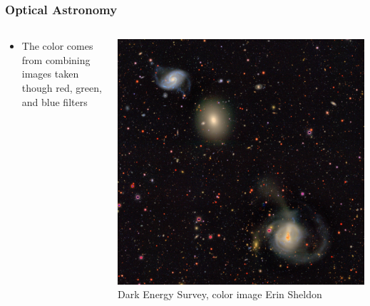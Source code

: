 \documentclass{beamer}
\begin{document}
\frame
{

    \frametitle{Optical Astronomy}


    \begin{columns}
        \begin{column}{0.5\textwidth}
            \begin{itemize}


                \item The color comes from combining images taken though red,
                    green, and blue filters


            \end{itemize}
        \end{column}
        \begin{column}{0.5\textwidth}
            \begin{center}
                \includegraphics[width=\textwidth]{DES0428-4748_gri_sv_mask_streaks_color_trim.jpg}
                \newline
                {\tiny Dark Energy Survey, color image Erin Sheldon}
            \end{center}

            
        \end{column}
    \end{columns}


}
\end{document}
